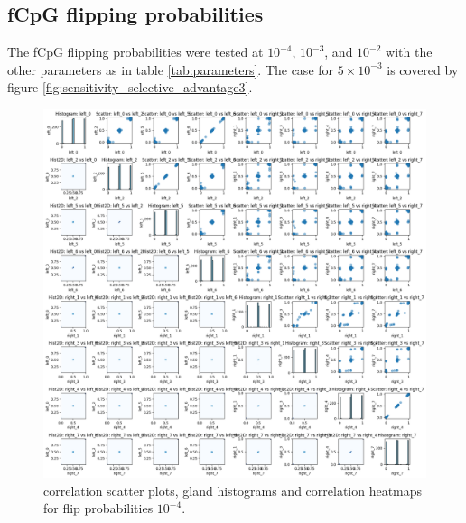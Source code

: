 \subsection{fCpG flipping probabilities}
The fCpG flipping probabilities were tested at $10^{-4}$, $10^{-3}$, and $10^{-2}$ with the other parameters as in table \ref{tab:parameters}. The case for $5\times10^{-3}$ is covered by figure \ref{fig:sensitivity_selective_advantage3}. \par
\begin{figure}[h]
    \centering
    \includegraphics[width=\textwidth]{Chapter_methylation/figures/sensitivity_flipprob1.png}
    \caption{correlation scatter plots, gland histograms and correlation heatmaps for flip probabilities $10^{-4}$.}
    \label{fig:sensitivity_flipprob1}
\end{figure}
